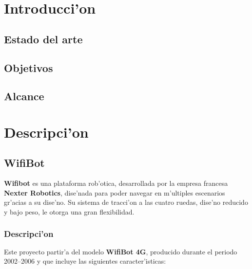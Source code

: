 \documentclass[twoside,12pt]{article}
\begin{document}
\newpage


\section{Introducci'on}

\subsection{Estado del arte}

\subsection{Objetivos}

\subsection{Alcance}
\newpage

\section{Descripci'on }

\subsection{WifiBot}
\textbf{Wifibot} es una plataforma rob'otica, desarrollada por la empresa francesa \textbf{Nexter Robotics}, dise'nada para poder navegar en m'ultiples escenarios gr'acias a su dise'no. Su sistema de tracci'on a las cuatro ruedas, dise'no reducido y bajo peso, le otorga una gran flexibilidad.

\subsubsection{Descripci'on}
Este proyecto partir'a del modelo \textbf{WifiBot 4G}, producido durante el periodo 2002--2006 y que incluye las siguientes caracter'isticas:
\end{document}
